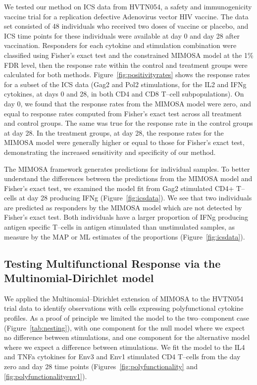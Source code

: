 \documentclass[11pt]{article}
\begin{document}
We tested our method on ICS data from HVTN054, a safety and immunogenicity vaccine trial for a replication defective Adenovirus vector HIV vaccine. The data set consisted of 48 individuals who received two doses of vaccine or placebo, and ICS time points for these individuals were available at day 0 and day 28 after vaccination. Responders for each cytokine and stimulation combination were classified using Fisher's exact test and the constrained MIMOSA model at the 1\% FDR level, then the response rate within the control and treatment groups were calculated for both methods. Figure~\ref{fig:positivityrates} shows the response rates for a subset of the ICS data (Gag2 and Pol2 stimulations, for the IL2 and IFNg cytokines, at days 0 and 28, in both CD4 and CD8 T--cell subpopulations). On day 0, we found that the response rates from the MIMOSA model were zero, and equal to response rates computed from Fisher's exact test across all treatment and control groups. The same was true for the response rate in the control groups at day 28. In the treatment groups, at day 28, the response rates for the MIMOSA model were  generally higher or equal to those for Fisher's exact test, demonstrating the increased sensitivity and specificity of our method.

The MIMOSA framework generates predictions for individual samples. To better understand the differences between the predictions from the MIMOSA model and Fisher's exact test, we examined the model fit from Gag2 stimulated CD4+ T--cells at day 28 producing IFNg (Figure~\ref{fig:icsdata}). We see that two individuals are predicted as responders by the MIMOSA model which are not detected by Fisher's exact test. Both individuals have a larger proportion of IFNg producing antigen specific T--cells in antigen stimulated than unstimulated samples, as measure by the MAP or ML estimates of the proportions (Figure~\ref{fig:icsdata}). 

\subsection*{Testing Multifunctional Response via the Multinomial-Dirichlet model}
We applied the Multinomial--Dirichlet extension of MIMOSA to the HVTN054 trial data to identify observations with cells expressing polyfunctional cytokine profiles. As a proof of principle we limited the model to the two--component case (Figure~\ref{tab:nesting}), with one component for the null model where we expect no difference between stimulations, and one component for the alternative model where we expect a difference between stimulations. We fit the model to the IL4 and TNFa cytokines for Env3 and Env1 stimulated CD4 T--cells from the day zero and day 28 time points (Figures~\ref{fig:polyfunctionality} and \ref{fig:polyfunctionalityenv1}). 
\end{document}
